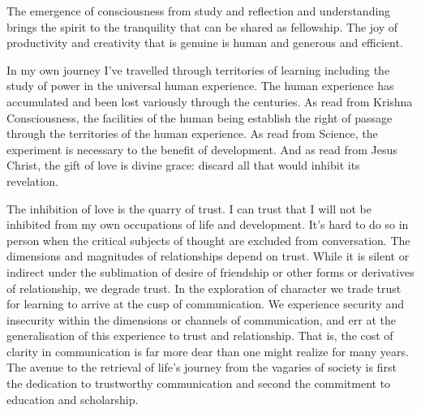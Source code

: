 

The emergence of consciousness from study and reflection and
understanding brings the spirit to the tranquility that can be shared
as fellowship.  The joy of productivity and creativity that is genuine
is human and generous and efficient.

In my own journey I've travelled through territories of learning
including the study of power in the universal human experience.  The
human experience has accumulated and been lost variously through the
centuries.  As read from Krishna Consciousness, the facilities of the
human being establish the right of passage through the territories of
the human experience.  As read from Science, the experiment is
necessary to the benefit of development.  And as read from Jesus
Christ, the gift of love is divine grace: discard all that would
inhibit its revelation.

The inhibition of love is the quarry of trust.  I can trust that I
will not be inhibited from my own occupations of life and development.
It's hard to do so in person when the critical subjects of thought are
excluded from conversation.  The dimensions and magnitudes of
relationships depend on trust.  While it is silent or indirect under
the sublimation of desire of friendship or other forms or derivatives
of relationship, we degrade trust.  In the exploration of character we
trade trust for learning to arrive at the cusp of communication.  We
experience security and insecurity within the dimensions or channels
of communication, and err at the generalisation of this experience to
trust and relationship.  That is, the cost of clarity in communication
is far more dear than one might realize for many years.  The avenue to
the retrieval of life's journey from the vagaries of society is first
the dedication to trustworthy communication and second the commitment
to education and scholarship.

\bye
